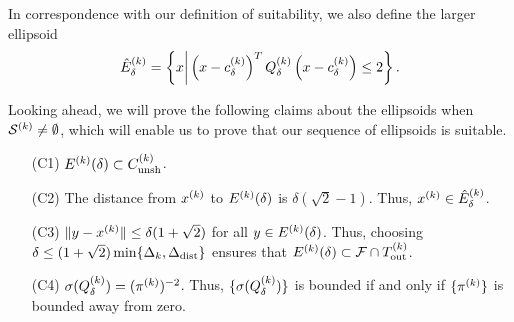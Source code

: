 \documentclass{article}
\begin{document}

In correspondence with our definition of suitability,  we also define the larger ellipsoid 
\begin{equation}
\label{define_scaled_ellipsoid_delta}
{{\hat E}^{(k)}_{\delta}} = \left\{x \bigg| \left(x-c^{(k)}_{\delta}\right)^T{Q^{(k)}_{\delta}}\left(x-c^{(k)}_{\delta}\right) \le 2\right\}.
\end{equation}

Looking ahead, we will prove the following claims about the ellipsoids when $\mathcal{S}^{(k)} \ne \emptyset$, which will enable us to prove that our sequence of ellipsoids is suitable.
\begin{enumerate}
\item[(C1)] ${E^{(k)}}(\delta) \subset {C^{(k)}_{\textrm{unsh}}}$.    
\item[(C2)] The distance from $x^{(k)}$ to  ${E^{(k)}}(\delta)$ is $\delta(\sqrt{2}-1)$.  Thus,
$x^{(k)} \in {{\hat E}^{(k)}_{\delta}}$.
\item[(C3)] $\|y-x^{(k)}\| \le \delta(1+ \sqrt{2})$ for all $y \in {E^{(k)}}(\delta)$.   
Thus, choosing 
$\delta \le (1+\sqrt{2}) \min\{ \Delta_k, \Delta_{\textrm{dist}}\}$ 
ensures that ${E^{(k)}}(\delta) \subset {\mathcal F} \cap {T_{\text{out}}^{(k)}}$.
\item[(C4)] $\sigma({Q^{(k)}_{\delta}}) = (\pi^{(k)})^{-2}$.   Thus,   $\{\sigma({Q^{(k)}_{\delta}})\}$ is bounded if and only if $\{\pi^{(k)}\}$ is bounded away from zero.   
\end{enumerate}

%
\end{document}
